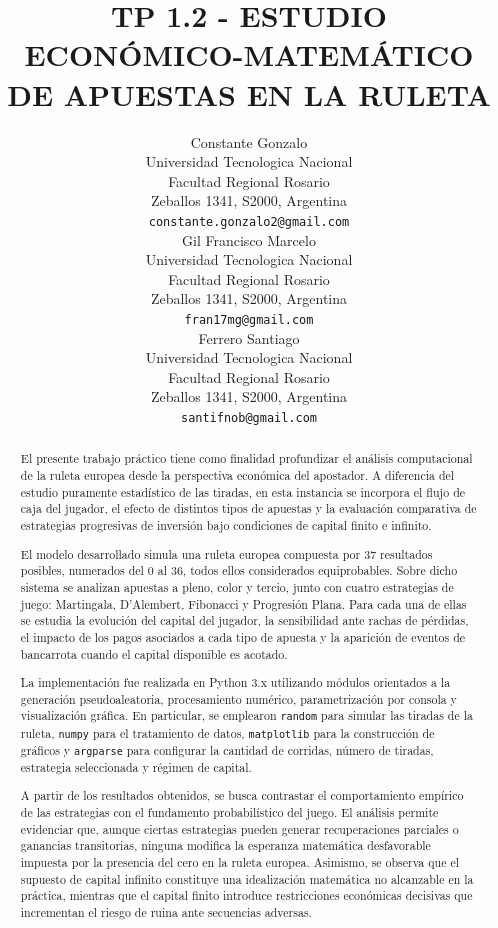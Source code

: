 \documentclass{article}
\title{TP 1.2 - ESTUDIO ECONÓMICO-MATEMÁTICO DE APUESTAS EN LA RULETA}
\author{
 Constante Gonzalo \\
  Universidad Tecnologica Nacional\\
  Facultad Regional Rosario\\
Zeballos 1341, S2000, Argentina 
\\
  \texttt{constante.gonzalo2@gmail.com} \\
   \And
 Gil Francisco Marcelo\\
  Universidad Tecnologica Nacional\\
  Facultad Regional Rosario\\
Zeballos 1341, S2000, Argentina 
 \\
  \texttt{fran17mg@gmail.com} \\
  \And
 Ferrero Santiago\\
  Universidad Tecnologica Nacional\\
  Facultad Regional Rosario\\
Zeballos 1341, S2000, Argentina 
\\
  \texttt{santifnob@gmail.com} \\
}
\begin{document}
\maketitle

\begin{abstract}
El presente trabajo práctico tiene como finalidad profundizar el análisis computacional de la ruleta europea desde la perspectiva económica del apostador. A diferencia del estudio puramente estadístico de las tiradas, en esta instancia se incorpora el flujo de caja del jugador, el efecto de distintos tipos de apuestas y la evaluación comparativa de estrategias progresivas de inversión bajo condiciones de capital finito e infinito.

El modelo desarrollado simula una ruleta europea compuesta por 37 resultados posibles, numerados del 0 al 36, todos ellos considerados equiprobables. Sobre dicho sistema se analizan apuestas a pleno, color y tercio, junto con cuatro estrategias de juego: Martingala, D'Alembert, Fibonacci y Progresión Plana. Para cada una de ellas se estudia la evolución del capital del jugador, la sensibilidad ante rachas de pérdidas, el impacto de los pagos asociados a cada tipo de apuesta y la aparición de eventos de bancarrota cuando el capital disponible es acotado.

La implementación fue realizada en Python 3.x utilizando módulos orientados a la generación pseudoaleatoria, procesamiento numérico, parametrización por consola y visualización gráfica. En particular, se emplearon \texttt{random} para simular las tiradas de la ruleta, \texttt{numpy} para el tratamiento de datos, \texttt{matplotlib} para la construcción de gráficos y \texttt{argparse} para configurar la cantidad de corridas, número de tiradas, estrategia seleccionada y régimen de capital.

A partir de los resultados obtenidos, se busca contrastar el comportamiento empírico de las estrategias con el fundamento probabilístico del juego. El análisis permite evidenciar que, aunque ciertas estrategias pueden generar recuperaciones parciales o ganancias transitorias, ninguna modifica la esperanza matemática desfavorable impuesta por la presencia del cero en la ruleta europea. Asimismo, se observa que el supuesto de capital infinito constituye una idealización matemática no alcanzable en la práctica, mientras que el capital finito introduce restricciones económicas decisivas que incrementan el riesgo de ruina ante secuencias adversas.
\end{abstract}
\end{document}
